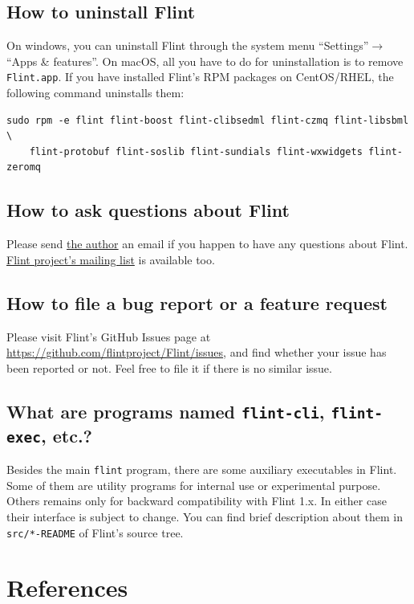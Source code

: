 \documentclass[a4paper,10pt]{report}
\begin{document}
\section{How to uninstall Flint}
\label{sec:org1b68a5d}
On windows, you can uninstall Flint through the system menu ``Settings''\(\to\)``Apps \& features''.
On macOS, all you have to do for uninstallation is to remove \texttt{Flint.app}.
If you have installed Flint's RPM packages on CentOS/RHEL, the following command
uninstalls them:
\begin{verbatim}
sudo rpm -e flint flint-boost flint-clibsedml flint-czmq flint-libsbml \
    flint-protobuf flint-soslib flint-sundials flint-wxwidgets flint-zeromq
\end{verbatim}

\section{How to ask questions about Flint}
\label{sec:orgf8eea71}
Please send \href{mailto:tabe@fixedpoint.jp}{the author} an email if you happen to have any questions about Flint.
\href{https://groups.google.com/g/flint-discuss}{Flint project's mailing list} is available too.

\section{How to file a bug report or a feature request}
\label{sec:org324c337}
Please visit Flint's GitHub Issues page at
\url{https://github.com/flintproject/Flint/issues},
and find whether your issue has been reported or not.
Feel free to file it if there is no similar issue.

\section{What are programs named \texttt{flint-cli}, \texttt{flint-exec}, etc.?}
\label{sec:orgaba2323}
Besides the main \texttt{flint} program, there are some auxiliary executables in
Flint. Some of them are utility programs for internal use or experimental
purpose. Others remains only for backward compatibility with Flint 1.x. In
either case their interface is subject to change. You can find brief description about
them in \texttt{src/*-README} of Flint's source tree.

\chapter{References}
\label{sec:org802a049}
\end{document}
